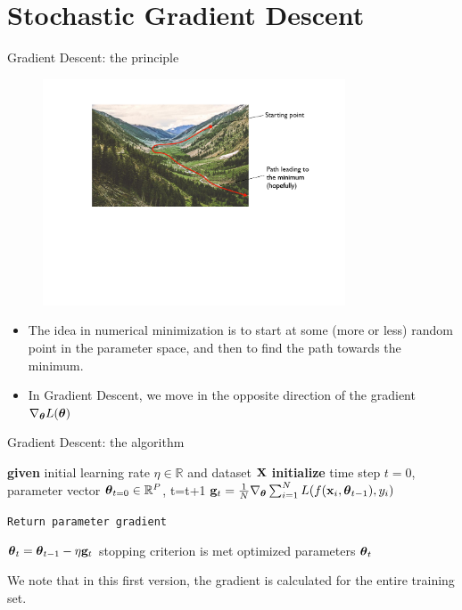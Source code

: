 \documentclass[handout,xcolor=pdftex,dvipsnames,table,mathserif]{beamer}
\begin{document}
\section{Stochastic Gradient Descent}

\begin{frame}{Gradient Descent: the principle}
\begin{figure}[htb]
\includegraphics[width=0.8\textwidth]{../graphics/Optimization_principle.pdf}
\end{figure}
\begin{itemize}
	\item The idea in numerical minimization is to start at some (more or less) random point in the parameter space, and then to find the path towards the minimum. 
	\item In Gradient Descent, we move in the opposite direction of the gradient $\nabla_{\boldsymbol{\theta}}L(\boldsymbol{\theta})$
\end{itemize}
\end{frame}

\begin{frame}{Gradient Descent: the algorithm \cite{Cauchy47}}
\begin{algorithm}[H]
\begin{algorithmic}[1]
\STATE \textbf{given} initial learning rate $\eta \in \mathbb{R}$ and dataset $\mathbf{X}$
\STATE \textbf{initialize} time step $t=0$, parameter vector $\boldsymbol{\theta}_{t=0} \in \mathbb{R}^P$,
\REPEAT
\STATE t=t+1
\STATE $\mathbf{g}_t = \frac{1}{N} \nabla_{\boldsymbol{\theta}} \sum_{i=1}^N L(f(\mathbf{x}_i,\boldsymbol{\theta}_{t-1}), y_i)$  \begin{tiny}\texttt{Return parameter gradient}\end{tiny}
\STATE $\boldsymbol{\theta}_t=\boldsymbol{\theta}_{t-1}  - \eta \mathbf{g}_t$
\UNTIL stopping criterion is met
\RETURN optimized parameters $\boldsymbol{\theta}_t$
\end{algorithmic}
\caption{pseudocode gradient descent }
\label{alg:GD}
\end{algorithm}
We note that in this first version, the gradient is calculated for the entire training set. 
\end{frame}
\end{document}

